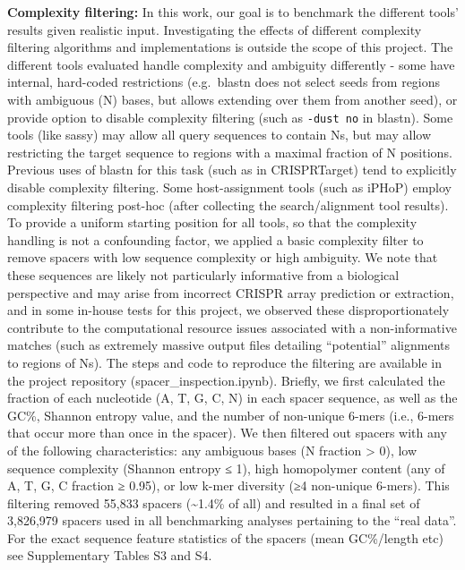 \documentclass[
]{article}
\begin{document}
\textbf{Complexity filtering:} In this work, our goal is to benchmark
the different tools' results given realistic input. Investigating the
effects of different complexity filtering algorithms and implementations
is outside the scope of this project. The different tools evaluated
handle complexity and ambiguity differently - some have internal,
hard-coded restrictions (e.g.~blastn does not select seeds from regions
with ambiguous (N) bases, but allows extending over them from another
seed), or provide option to disable complexity filtering (such as
\texttt{-dust\ no} in blastn). Some tools (like sassy) may allow all
query sequences to contain Ns, but may allow restricting the target
sequence to regions with a maximal fraction of N positions. Previous
uses of blastn for this task (such as in CRISPRTarget) tend to
explicitly disable complexity filtering. Some host-assignment tools
(such as iPHoP) employ complexity filtering post-hoc (after collecting
the search/alignment tool results). To provide a uniform starting
position for all tools, so that the complexity handling is not a
confounding factor, we applied a basic complexity filter to remove
spacers with low sequence complexity or high ambiguity. We note that
these sequences are likely not particularly informative from a
biological perspective and may arise from incorrect CRISPR array
prediction or extraction, and in some in-house tests for this project,
we observed these disproportionately contribute to the computational
resource issues associated with a non-informative matches (such as
extremely massive output files detailing ``potential'' alignments to
regions of Ns). The steps and code to reproduce the filtering are
available in the project repository (spacer\_inspection.ipynb). Briefly,
we first calculated the fraction of each nucleotide (A, T, G, C, N) in
each spacer sequence, as well as the GC\%, Shannon entropy value, and
the number of non-unique 6-mers (i.e., 6-mers that occur more than once
in the spacer). We then filtered out spacers with any of the following
characteristics: any ambiguous bases (N fraction \textgreater{} 0), low
sequence complexity (Shannon entropy ≤ 1), high homopolymer content (any
of A, T, G, C fraction ≥ 0.95), or low k-mer diversity (≥4 non-unique
6-mers). This filtering removed 55,833 spacers (\textasciitilde1.4\% of
all) and resulted in a final set of 3,826,979 spacers used in all
benchmarking analyses pertaining to the ``real data''. For the exact
sequence feature statistics of the spacers (mean GC\%/length etc) see
Supplementary Tables S3 and S4.
\end{document}
